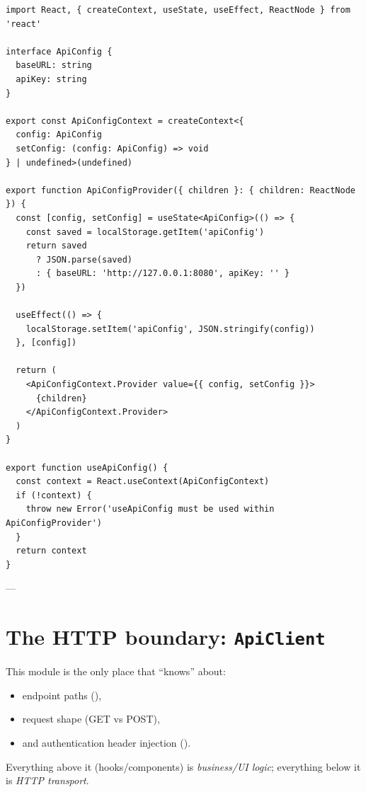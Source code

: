 \begin{listing}[htbp]
\caption{API configuration context and persistence}
\label{lst:ch21-api-config}
\begin{verbatim}
import React, { createContext, useState, useEffect, ReactNode } from 'react'

interface ApiConfig {
  baseURL: string
  apiKey: string
}

export const ApiConfigContext = createContext<{
  config: ApiConfig
  setConfig: (config: ApiConfig) => void
} | undefined>(undefined)

export function ApiConfigProvider({ children }: { children: ReactNode }) {
  const [config, setConfig] = useState<ApiConfig>(() => {
    const saved = localStorage.getItem('apiConfig')
    return saved
      ? JSON.parse(saved)
      : { baseURL: 'http://127.0.0.1:8080', apiKey: '' }
  })

  useEffect(() => {
    localStorage.setItem('apiConfig', JSON.stringify(config))
  }, [config])

  return (
    <ApiConfigContext.Provider value={{ config, setConfig }}>
      {children}
    </ApiConfigContext.Provider>
  )
}

export function useApiConfig() {
  const context = React.useContext(ApiConfigContext)
  if (!context) {
    throw new Error('useApiConfig must be used within ApiConfigProvider')
  }
  return context
}
\end{verbatim}
\end{listing}

---

\section{The HTTP boundary: \texttt{ApiClient}}
\label{sec:api-client}

This module is the only place that ``knows'' about:

\begin{itemize}
  \item endpoint paths (),
  \item request shape (GET vs POST),
  \item and authentication header injection ().
\end{itemize}

Everything above it (hooks/components) is \emph{business/UI logic}; everything below it is \emph{HTTP transport}.

